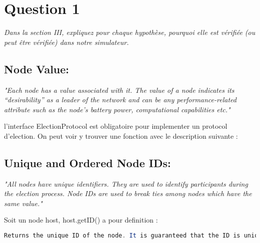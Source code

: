 \documentclass[11pt,a4paper,sans]{report}
\begin{document}
	\begin{comment}
	an undirected graph that changes over time as nodes move. The vertices in the graph correspond to mobile nodes and an edge between a pair of nodes represents the fact that the two nodes are within each other’s transmission radii and, hence, can directly communicate with one another. The graph can become disconnected if the network is partitioned due to node movement
	\end{comment}



	\section{Question 1}
	\textit{Dans la section III, expliquez pour chaque hypothèse, pourquoi elle est vérifiée (ou peut être vérifiée) dans notre simulateur.}

	\subsection{Node Value:}
	\textit{"Each node has a value associated with it. The value of a node indicates its “desirability” as a leader of the network and can be any performance-related attribute such as the node’s battery power, computational capabilities etc."}

	l'interface ElectionProtocol est obligatoire pour implementer un protocol d'election. On peut voir y trouver une fonction avec le description suivante :


	\subsection{Unique and Ordered Node IDs:}
	\textit{"All nodes have unique identifiers. They are used to identify participants during the election process. Node IDs are used to break ties among nodes which have the same value."}

	Soit un node host, host.getID() a pour definition :
	\begin{lstlisting}[language=java]
	Returns the unique ID of the node. It is guaranteed that the ID is unique during the entire simulation, that is, there will be no different Node objects with the same ID in the system during one invocation of the JVM. Preferably nodes should implement hashCode() based on this ID.
	\end{lstlisting}
\end{document}
